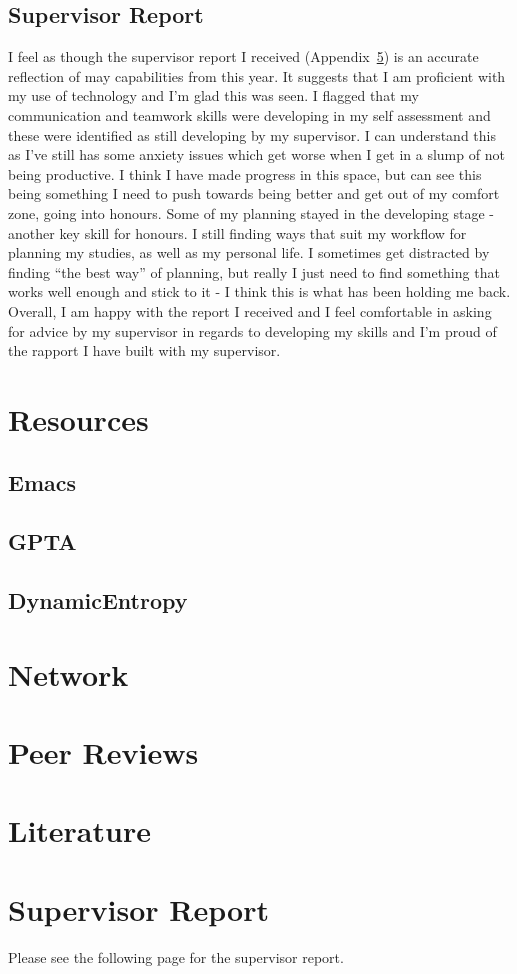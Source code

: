 \documentclass[11pt]{article}
\begin{document}
\subsection{Supervisor Report}

I feel as though the supervisor report I received (Appendix~\ref{appendix:suprep}) is an accurate reflection of may capabilities from this year. It suggests that I am proficient with my use of technology and I'm glad this was seen. I flagged that my communication and teamwork skills were developing in my self assessment and these were identified as still developing by my supervisor. I can understand this as I've still has some anxiety issues which get worse when I get in a slump of not being productive. I think I have made progress in this space, but can see this being something I need to push towards being better and get out of my comfort zone, going into honours. Some of my planning stayed in the developing stage - another key skill for honours. I still finding ways that suit my workflow for planning my studies, as well as my personal life. I sometimes get distracted by finding ``the best way'' of planning, but really I just need to find something that works well enough and stick to it - I think this is what has been holding me back. Overall, I am happy with the report I received and I feel comfortable in asking for advice by my supervisor in regards to developing my skills and I'm proud of the rapport I have built with my supervisor.

\section{Resources}

\subsection{Emacs}
\subsection{GPTA}
\subsection{DynamicEntropy}

\section{Network}

\section{Peer Reviews}

\section{Literature}




\appendix

\section{Supervisor Report}
\label{appendix:suprep}

Please see the following page for the supervisor report.


\end{document}
